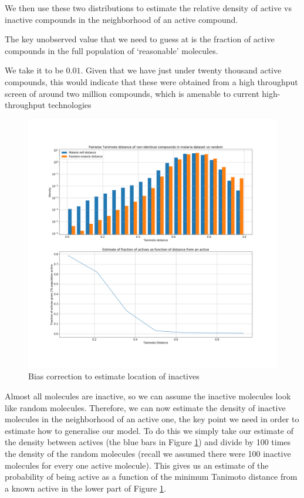 \documentclass{article}
\begin{document}
We then use these two distributions to estimate the relative density of active vs inactive compounds in the neighborhood of an active compound.

 The key unobserved value that we need to guess at is the fraction of active compounds in the full population of `reasonable' molecules.  
 

 We take it to be $0.01$.  Given that we have just under twenty thousand active compounds, this would indicate that these were obtained from a high throughput screen of around two million compounds, 
which is amenable to current high-throughput technologies\cite{PaweSzymanskiMagdalenaMarkowicz2012}

\begin{figure}
    \centering
    \includegraphics[width=\textwidth]{fig5_bias_correction.png}
    \caption{Bias correction to estimate location of inactives}
    \label{fig:mal_cluster}
\end{figure}

Almost all molecules are inactive, so we can assume the inactive molecules look like random molecules.  Therefore, we can now estimate the density of inactive molecules in the neighborhood of an active one, the key point we need in order to estimate how to generalise our model.  To do this we simply take our estimate of the density between actives (the blue bars in Figure \ref{fig:mal_cluster}) and divide by 100 times the density of the random molecules (recall we assumed there were 100 inactive molecules for every one active molecule).  This gives us an estimate of the probability of being active as a function of the minimum Tanimoto distance from a known active in the lower part of Figure \ref{fig:mal_cluster}.
\end{document}

